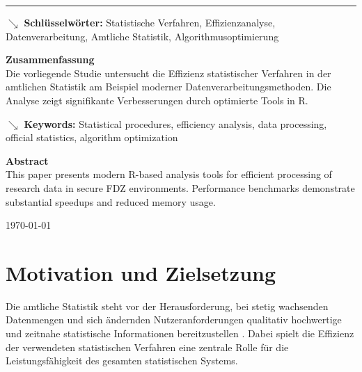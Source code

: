 \documentclass[
  ngerman,
  10pt,
  twocolumn]{article}
\begin{document}
\begin{titlepage}
\begin{minipage}[t]{9cm}
\vspace{0.5cm}

{\color{wistaBlue}\rule{\linewidth}{0.5pt}}

\vspace{0.5cm}

{\color{wistaBlue}$\searrow$ {\bfseries Schlüsselwörter:} Statistische Verfahren, Effizienzanalyse, Datenverarbeitung, Amtliche Statistik, Algorithmusoptimierung}

\vspace{0.3cm}

{\color{wistaDarkGray}\bfseries Zusammenfassung}\\
\small
Die vorliegende Studie untersucht die Effizienz statistischer Verfahren in der amtlichen Statistik am Beispiel moderner Datenverarbeitungsmethoden. Die Analyse zeigt signifikante Verbesserungen durch optimierte Tools in R.

\vspace{0.5cm}

{\color{wistaBlue}$\searrow$ {\bfseries Keywords:} Statistical procedures, efficiency analysis, data processing, official statistics, algorithm optimization}

\vspace{0.3cm}

{\color{wistaDarkGray}\bfseries Abstract}\\
\small
This paper presents modern R-based analysis tools for efficient processing of research data in secure FDZ environments. Performance benchmarks demonstrate substantial speedups and reduced memory usage.

\end{minipage}

\vfill

\begin{center}
{\small\color{wistaLightGray}\today}
\end{center}

\end{titlepage}

\twocolumn


\section{Motivation und Zielsetzung}\label{sec-intro}

Die amtliche Statistik steht vor der Herausforderung, bei stetig
wachsenden Datenmengen und sich ändernden Nutzeranforderungen qualitativ
hochwertige und zeitnahe statistische Informationen bereitzustellen
\autocite{destatis2023}. Dabei spielt die Effizienz der verwendeten
statistischen Verfahren eine zentrale Rolle für die Leistungsfähigkeit
des gesamten statistischen Systems.
\end{document}
